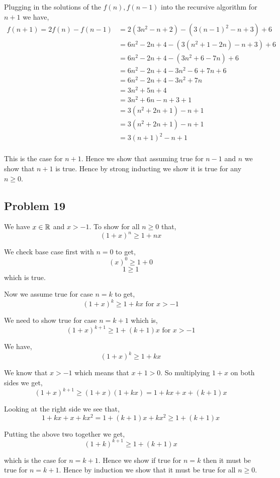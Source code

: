 \documentclass[a4paper]{report}
\begin{document}
Plugging in the solutions of the $f(n),f(n - 1)$ into the recursive algorithm for $n + 1$ we have, 
\begin{align*}
    f(n + 1) = 2f(n) - f(n - 1) &= 2(3n^2 - n + 2) - (3(n - 1)^2 -n + 3) + 6\\
                                &= 6n^2 -2n + 4 - (3(n^2 + 1 - 2n) -n + 3) + 6\\
                                &= 6n^2 -2n + 4 - (3n^2 + 6 - 7n ) + 6\\
                                &= 6n^2 -2n + 4 - 3n^2 - 6 + 7n  + 6\\
                                &= 6n^2 -2n + 4 - 3n^2  + 7n\\
                                &= 3n^2 + 5n + 4 \\
                                &= 3n^2 + 6n - n + 3 + 1 \\
                                &= 3(n^2 + 2n  + 1)- n + 1 \\
                                &= 3(n^2 + 2n  + 1)- n + 1 \\
                                &= 3(n + 1)^2- n + 1 \\
\end{align*}

This is the case for $n + 1$. Hence we show that assuming true for $n - 1$ and $n$ we show that  $n + 1$ is true. Hence by strong inducting we show it is true for any $n \ge 0$.

\subsection*{Problem 19}

We have $x \in \mathbb{R}$ and  $x > -1$. To show for all $n \ge 0$ that,  
$$ (1 + x)^{n} \ge 1 + nx $$ 

We check base case first with $n  = 0$ to get, 
$$ (x)^{0} \ge 1 + 0 $$ 
$$ 1 \ge 1 $$ 
which is true.

Now we assume true for case $n = k$ to get, 
$$ (1 + x)^{k} \ge 1 + kx \text{ for $x > -1$} $$ 

We need to show true for case $ n= k + 1 $ which is, 
$$ (1 + x)^{k + 1} \ge 1 + (k + 1)x \text{ for $x > -1$} $$ 


We have, 
$$ (1 + x)^{k} \ge 1 + kx$$

We know that $x > -1$ which means that $x + 1 > 0$. So multiplying  $1 + x$ on both sides we get, 
$$ (1 + x)^{k + 1} \ge  (1 + x)(1 + kx) = 1 + kx + x + (k + 1)x $$ 

Looking at the right side we see that, 
$$ 1 + kx + x + kx^2 = 1 + (k + 1)x + kx^2 \ge 1 + (k + 1)x $$ 

Putting the above two together we get, 
$$ (1 + k)^{k + 1} \ge 1 + (k + 1)x $$ 

which is the case for $n = k + 1$. Hence we show if true for  $n = k$ then it must be true for $n = k + 1$. Hence by induction we show that it must be true for all $n \ge 0$.
\end{document}

